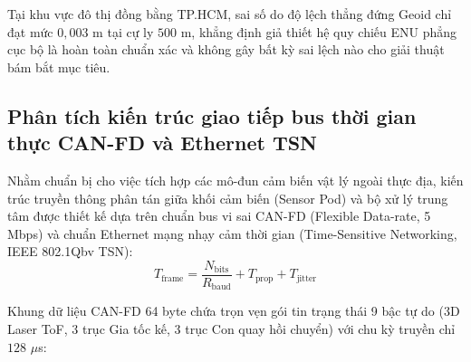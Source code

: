 \begin{table}[H]
\centering
\caption{Kết quả tính toán từ mô hình độ lệch thẳng đứng Geoid EGM2008 tại các vùng địa hình}
\label{tab:geoid-deflection-terrain-sweep-w15}
\end{table}

Tại khu vực đô thị đồng bằng TP.HCM, sai số do độ lệch thẳng đứng Geoid chỉ đạt mức $0{,}003$ m tại cự ly $500$ m, khẳng định giả thiết hệ quy chiếu ENU phẳng cục bộ là hoàn toàn chuẩn xác và không gây bất kỳ sai lệch nào cho giải thuật bám bắt mục tiêu.

\subsection{Phân tích kiến trúc giao tiếp bus thời gian thực CAN-FD và Ethernet TSN}

\hspace{0.5cm} Nhằm chuẩn bị cho việc tích hợp các mô-đun cảm biến vật lý ngoài thực địa, kiến trúc truyền thông phân tán giữa khối cảm biến (Sensor Pod) và bộ xử lý trung tâm được thiết kế dựa trên chuẩn bus vi sai CAN-FD (Flexible Data-rate, 5 Mbps) và chuẩn Ethernet mạng nhạy cảm thời gian (Time-Sensitive Networking, IEEE 802.1Qbv TSN):
\begin{equation}
T_{\text{frame}} = \frac{N_{\text{bits}}}{R_{\text{baud}}} + T_{\text{prop}} + T_{\text{jitter}}
\label{eq:canfd-frame-latency-formula}
\end{equation}

Khung dữ liệu CAN-FD 64 byte chứa trọn vẹn gói tin trạng thái 9 bậc tự do (3D Laser ToF, 3 trục Gia tốc kế, 3 trục Con quay hồi chuyển) với chu kỳ truyền chỉ $128$ $\mu$s:

